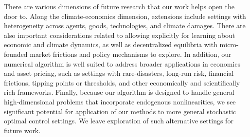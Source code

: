 \documentclass[12pt]{article}
\begin{document}
There are various dimensions of future research that our work helps open the door to. Along the climate-economics dimension, extensions include settings with heterogeneity across agents, goods, technologies, and climate damages. There are also important considerations related to allowing explicitly for learning about economic and climate dynamics, as well as decentralized equilibria with micro-founded market frictions and policy mechanisms to explore. In addition, our numerical algorithm is well suited to address broader applications in economics and asset pricing, such as settings with rare-disasters, long-run risk, financial frictions, tipping points or thresholds, and other economically and scientifically rich frameworks. Finally, because our algorithm is designed to handle general high-dimensional problems that incorporate endogenous nonlinearities, we see significant potential for application of our methods to more general stochastic optimal control settings. We leave exploration of such alternative settings for future work. 





% 





{
\setlength{\bibsep}{0pt plus 0.5ex}

}

\end{document}
